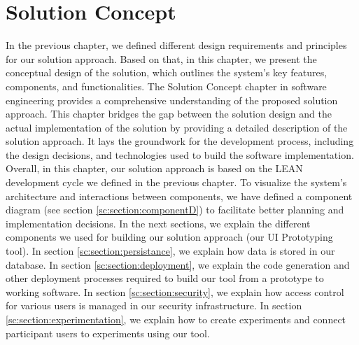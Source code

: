 
\chapter{Solution Concept}

\ifpdf
    \graphicspath{{Chapters/Solution-Concept/Figs/}{Chapters/Solution-Concept/Figs/}{Chapters/Solution-Concept/Figs/}}
\else
    \graphicspath{{Chapters/Solution-Concept/Figs/}{Chapters/Solution-Concept/Figs/}}
\fi
In the previous chapter, we defined different design requirements and principles for our solution approach. 
Based on that, in this chapter, we present the conceptual design of the solution, which outlines the system's key features, components, and functionalities. 
The Solution Concept chapter in software engineering provides a comprehensive understanding of the proposed solution approach. 
This chapter bridges the gap between the solution design and the actual implementation of the solution by providing a detailed description of the solution approach. 
It lays the groundwork for the development process, including the design decisions, and technologies used to build the software implementation. 
Overall, in this chapter, our solution approach is based on the LEAN development cycle we defined in the previous chapter.
To visualize the system's architecture and interactions between components, we have defined a component diagram (see section \ref{sc:section:componentD}) to facilitate better planning and implementation decisions.
In the next sections, we explain the different components we used for building our solution approach (our UI Prototyping tool). 
In section \ref{sc:section:persistance}, we explain how data is stored in our database. 
In section \ref{sc:section:deployment}, we explain the code generation and other deployment processes required to build our tool from a prototype to working software.
In section \ref{sc:section:security}, we explain how access control for various users is managed in our security infrastructure. 
In section \ref{sc:section:experimentation}, we explain how to create experiments and connect participant users to experiments using our tool. 

